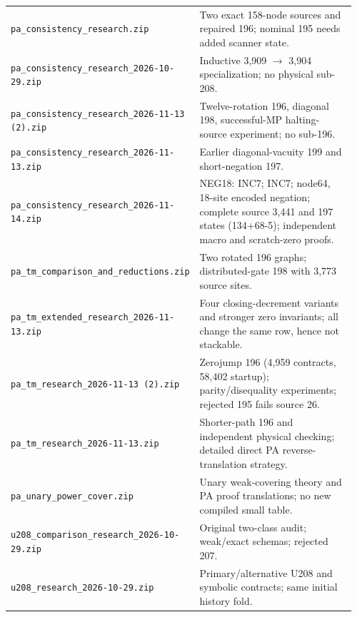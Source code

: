 \begin{longtable}{@{}>{\raggedright\arraybackslash}p{0.43\linewidth}>{\raggedright\arraybackslash}p{0.53\linewidth}@{}}
\nolinkurl{pa_consistency_research.zip} & Two exact 158-node sources and repaired 196; nominal 195 needs added scanner state.\\[4pt]
\nolinkurl{pa_consistency_research_2026-10-29.zip} & Inductive 3,909 $\to$ 3,904 specialization; no physical sub-208.\\[4pt]
\nolinkurl{pa_consistency_research_2026-11-13 (2).zip} & Twelve-rotation 196, diagonal 198, successful-MP halting-source experiment; no sub-196.\\[4pt]
\nolinkurl{pa_consistency_research_2026-11-13.zip} & Earlier diagonal-vacuity 199 and short-negation 197.\\[4pt]
\nolinkurl{pa_consistency_research_2026-11-14.zip} & NEG18: INC7; INC7; node64, 18-site encoded negation; complete source 3,441 and 197 states (134+68-5); independent macro and scratch-zero proofs.\\[4pt]
\nolinkurl{pa_tm_comparison_and_reductions.zip} & Two rotated 196 graphs; distributed-gate 198 with 3,773 source sites.\\[4pt]
\nolinkurl{pa_tm_extended_research_2026-11-13.zip} & Four closing-decrement variants and stronger zero invariants; all change the same row, hence not stackable.\\[4pt]
\nolinkurl{pa_tm_research_2026-11-13 (2).zip} & Zerojump 196 (4,959 contracts, 58,402 startup); parity/disequality experiments; rejected 195 fails source 26.\\[4pt]
\nolinkurl{pa_tm_research_2026-11-13.zip} & Shorter-path 196 and independent physical checking; detailed direct PA reverse-translation strategy.\\[4pt]
\nolinkurl{pa_unary_power_cover.zip} & Unary weak-covering theory and PA proof translations; no new compiled small table.\\[4pt]
\nolinkurl{u208_comparison_research_2026-10-29.zip} & Original two-class audit; weak/exact schemas; rejected 207.\\[4pt]
\nolinkurl{u208_research_2026-10-29.zip} & Primary/alternative U208 and symbolic contracts; same initial history fold.\\[4pt]
\end{longtable}
\endgroup
